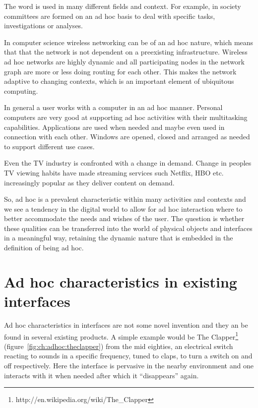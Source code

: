 The word is used in many different fields and context.
For example, in society committees are formed on an ad hoc basis to deal with specific tasks, investigations or analyses.

In computer science wireless networking can be of an ad hoc nature, which means that that the network is not dependent on a preexisting infrastructure.
Wireless ad hoc networks are highly dynamic and all participating nodes in the network graph are more or less doing routing for each other.
This makes the network adaptive to changing contexts, which is an important element of ubiquitous computing.

In general a user works with a computer in an ad hoc manner.
Personal computers are very good at supporting ad hoc activities with their multitasking capabilities.
Applications are used when needed and maybe even used in connection with each other.
Windows are opened, closed and arranged as needed to support different use cases.

Even the TV industry is confronted with a change in demand.
Change in peoples TV viewing habits have made streaming services such Netflix, HBO etc. increasingly popular as they deliver content on demand.

So, ad hoc is a prevalent characteristic within many activities and contexts and we see a tendency in the digital world to allow for ad hoc interaction where to better accommodate the needs and wishes of the user.
The question is whether these qualities can be transferred into the world of physical objects and interfaces in a meaningful way, retaining the dynamic nature that is embedded in the definition of being ad hoc.

\section{Ad hoc characteristics in existing interfaces}
Ad hoc characteristics in interfaces are not some novel invention and they an be found in several existing products.
A simple example would be The Clapper\footnote{http://en.wikipedia.org/wiki/The\_Clapper} (figure~\ref{fig:ch:adhoc:theclapper}) from the mid eighties, an electrical switch reacting to sounds in a specific frequency, tuned to claps, to turn a switch on and off respectively.
Here the interface is pervasive in the nearby environment and one interacts with it when needed after which it ``disappears'' again.

